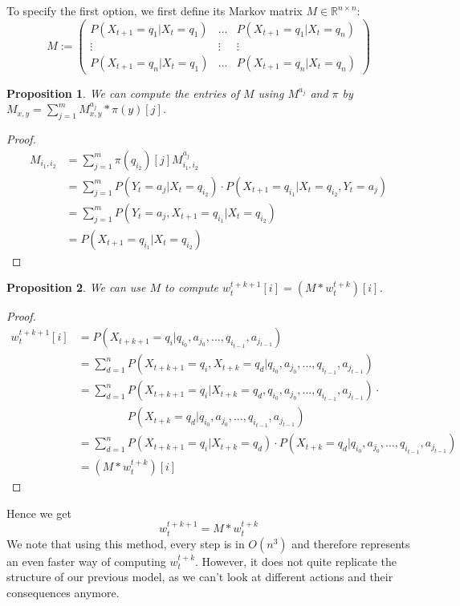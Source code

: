 \documentclass{article}
\newtheorem{prop}{Proposition}
\theoremstyle{definition}
\begin{document}
To specify the first option, we first define its Markov matrix $M \in \mathbb{R}^{n\times n}$: 
\[
M:=
\left (
\begin{matrix}
P(X_{t+1}=q_1|X_{t}=q_1) &  \ldots & P(X_{t+1}=q_1|X_t=q_n) \\
\vdots & \vdots & \vdots \\
P(X_{t+1}=q_n|X_t=q_1) & \ldots & P(X_{t+1}=q_n|X_t=q_n) 
\end{matrix}
\right )
\]
\begin{prop}
We can compute the entries of $M$ using $M^{a_j}$ and $\pi$ by $M_{x,y}=\sum\limits_{j=1}^{m} M^{a_j}_{x,y}*\pi(y)[j]$.
\end{prop} 
\begin{proof}
\begin{align*}
M_{i_1,i_2}&=\sum\limits_{j=1}^{m} \pi(q_{i_2})[j]M^{a_j}_{i_1,i_2} \\
&=\sum\limits_{j=1}^{m} P(Y_{t}=a_j|X_t=q_{i_2})\cdot P(X_{t+1}=q_{i_1}|X_t=q_{i_2},Y_t=a_j) \\
&=\sum\limits_{j=1}^{m} P(Y_t=a_j,X_{t+1}=q_{i_1}|X_t=q_{i_2}) \\
&=P(X_{t+1}=q_{i_1}|X_t=q_{i_2})
\end{align*}
\end{proof}
\begin{prop}
We can use $M$ to compute $w_t^{t+k+1}[i]=(M*w_t^{t+k})[i]$.
\end{prop}
\begin{proof}
\begin{align*}
w_t^{t+k+1}[i]&=P(X_{t+k+1}=q_i|q_{i_0},a_{j_0},\ldots,q_{i_{t-1}},a_{j_{t-1}}) \\
&=\sum\limits_{d=1}^{n} P(X_{t+k+1}=q_i,X_{t+k}=q_d|q_{i_0},a_{j_0},\ldots,q_{i_{t-1}},a_{j_{t-1}}) \\
&=\sum\limits_{d=1}^{n} P(X_{t+k+1}=q_i|X_{t+k}=q_d,q_{i_0},a_{j_0},\ldots,q_{i_{t-1}},a_{j_{t-1}})\cdot \\
& \phantom{= \sum\limits_{d=1}^{n}} P(X_{t+k}=q_d|q_{i_0},a_{j_0},\ldots,q_{i_{t-1}},a_{j_{t-1}}) \\
&=\sum\limits_{d=1}^{n} P(X_{t+k+1}=q_i|X_{t+k}=q_d)\cdot P(X_{t+k}=q_d|q_{i_0},a_{j_0},\ldots,q_{i_{t-1}},a_{j_{t-1}}) \\
&=(M*w_t^{t+k})[i]
\end{align*}
\end{proof}
Hence we get 
\[
w_t^{t+k+1}=M*w_t^{t+k}
\]
We note that using this method, every step is in $O(n^3)$ and therefore represents an even faster way of computing $w_t^{t+k}$. However, it does not quite replicate the structure of our previous model, as we can't look at different actions and their consequences anymore.
\end{document}
